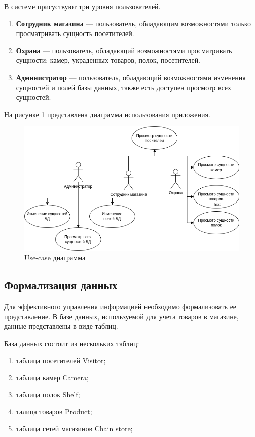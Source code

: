 В системе присуствуют три уровня пользователей.

\begin{enumerate}[label=\arabic*.]
    \item \textbf{Сотрудник магазина} --- пользователь, обладающим возможностями только просматривать
    сущность посетителей.
	\item \textbf{Охрана} --- пользователь, обладающий возможностями просматривать сущности: камер,
	украденных товаров, полок, посетителей.
	\item \textbf{Администратор} --- пользователь, обладающий возможностями изменения сущностей и полей
	базы данных, также есть доступен просмотр всех сущностей.
\end{enumerate}

На рисунке \ref{fig:anal:use-case} представлена диаграмма использования приложения.

\begin{figure}[ht!]
	\centering
	\includegraphics[width=0.7\linewidth]{assets/images/Use-case.drawio.png}
	\caption{Use-case диаграмма}
	\label{fig:anal:use-case}
\end{figure}
\FloatBarrier

\subsection{Формализация данных}

Для эффективного управления информацией необходимо формализовать ее представление. В базе данных,
используемой для учета товаров в магазине, данные представлены в виде таблиц.

База данных состоит из нескольких таблиц:

\begin{enumerate}[label=\arabic*.]
	\item таблица посетителей Visitor;
	\item таблица камер Camera;
	\item таблица полок Shelf;
	\item талица товаров Product;
	\item таблица сетей магазинов Chain store;
\end{enumerate}

